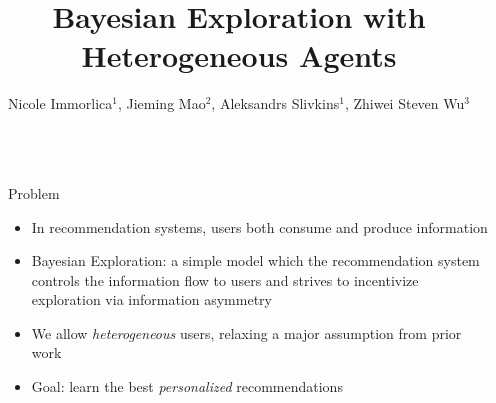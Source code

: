 \documentclass[final]{beamer}
\title{Bayesian Exploration with Heterogeneous Agents} %
\author{Nicole Immorlica$^1$, Jieming Mao$^2$, Aleksandrs Slivkins$^1$, Zhiwei Steven Wu$^3$} %
\institute{Microsoft Research$^1$, University of Pennsylvania$^2$, University of Minnesota$^3$} %
\newlength{\sepwid}
\newlength{\onecolwid}
\begin{document}

\setlength{\belowcaptionskip}{2ex} %
\setlength\belowdisplayshortskip{2ex} %

\begin{frame}[t] %

\begin{columns}[t] %

\begin{column}{\sepwid}\end{column} %

\begin{column}{\onecolwid} %


\begin{alertblock}{Problem}
\begin{itemize}
\item In recommendation systems, users both consume and produce information
\item Bayesian Exploration: a simple model which the recommendation system controls the information flow to users and strives to incentivize exploration via information asymmetry
\item We allow \emph{heterogeneous} users, relaxing a major assumption from prior work
\item Goal: learn the best \emph{personalized} recommendations
\end{itemize}
\end{alertblock}



\end{column}
\end{columns}
\end{frame}
\end{document}
